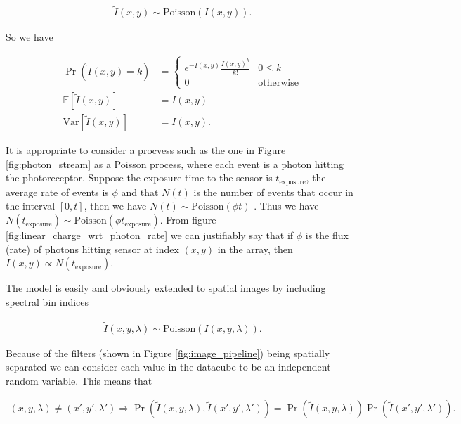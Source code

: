 \documentclass[12pt,twoside,notitlepage]{report}
\newcommand{\var}{\text{Var}}
\newcommand{\bb}[1]{\mathbb{#1}}
\begin{document}
            \begin{align}
                \tilde{I}(x,y) \sim \text{Poisson}(I(x,y)).
            \end{align}

            So we have

            \begin{align}
                \Pr(\tilde{I}(x,y) = k) & = 
                    \begin{cases}
                        e^{-I(x,y)} \frac{I(x,y)^k}{k!} & 0 \leq k              \label{eq:image_poisson} \\
                        0 & \text{otherwise}
                    \end{cases} \\
                \bb{E}\left[ \tilde{I}(x,y) \right] & = I(x,y) \\
                \var\left[ \tilde{I}(x,y) \right] & = I(x,y).                 
            \end{align}

            It is appropriate to consider a procvess such as the one in Figure \ref{fig:photon_stream} as a Poisson process, where 
            each event is a photon hitting the photoreceptor. Suppose the exposure time to the sensor is 
            $t_{\text{exposure}}$, the average rate of events is $\phi$ and that $N(t)$ is the number of events that 
            occur in the interval $[0,t]$, then we have $N(t) \sim \text{Poisson}(\phi t)$ \cite{ross2002probability}. 
            Thus we have $N(t_{\text{exposure}}) \sim \text{Poisson}(\phi t_{\text{exposure}})$. From figure 
            \ref{fig:linear_charge_wrt_photon_rate} we can justifiably say that if $\phi$ is the flux (rate) of 
            photons hitting sensor at index $(x,y)$ in the array, then $I(x,y) \propto N(t_{\text{exposure}})$.
            
            The model is easily and obviously extended to spatial images by including spectral bin indices 

            \begin{align}
                \tilde{I}(x,y,\lambda) \sim \text{Poisson}(I(x,y,\lambda)).
            \end{align}

            Because of the filters (shown in Figure \ref{fig:image_pipeline}) being spatially separated we can consider 
            each value in the datacube to be an independent random variable. This means that 

            \begin{align}
                (x,y,\lambda) \neq (x',y',\lambda') \Rightarrow 
                      \Pr(\tilde{I}(x,y,\lambda), \tilde{I}(x',y',\lambda')) = \Pr(\tilde{I}(x,y,\lambda)) \Pr(\tilde{I}(x',y',\lambda')).
            \end{align}
\end{document}
